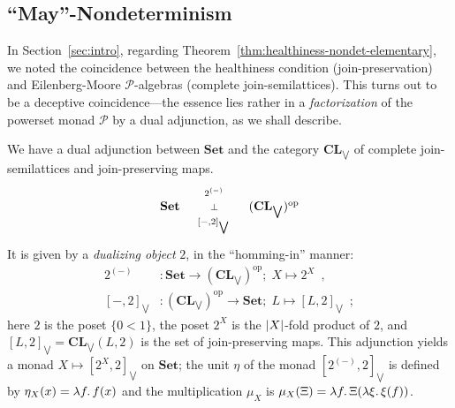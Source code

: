 \documentclass[9pt, preprint]{sigplanconf}
\theoremstyle{theorem}
\theoremstyle{definition}
\newcommand{\pow}{\mathcal{P}}
\newcommand{\place}{{-}}
\newcommand{\op}{\mathrm{op}}
\newcommand{\Set}{\mathbf{Set}}
\newcommand{\Sets}{\Set}
\newcommand{\CL}{\mathbf{CL}}
\newcommand{\biglor}{\bigvee}
\DeclarePairedDelimiter\abs{\lvert}{\rvert}
\DeclarePairedDelimiter\p{(}{)}
\newcommand{\longto}{\longrightarrow}
\begin{document}
\subsection{``May''-Nondeterminism}
\label{sub:diamond-modality}
In Section~\ref{sec:intro}, regarding
Theorem~\ref{thm:healthiness-nondet-elementary}, we noted
the coincidence between the healthiness condition (join-preservation)
and Eilenberg-Moore $\pow$-algebras (complete join-semilattices).
This turns out to be a deceptive coincidence---the essence lies rather
in a \emph{factorization} of the powerset monad $\pow$ by a dual
adjunction, as we shall describe.

We have a dual adjunction between $\Set$ and the category
$\CL_{\biglor}$
of complete join-semilattices and join-preserving maps.
\begin{align}
  \label{eq:set-jslat-dualadj}
  \vcenter{\xymatrix@1@C+3em{
    \Set \ar@/^/[r]^-{2^{(\place)}} \ar@{}[r]|-{\bot}
    & (\CL_{\bigvee})^{\op} \ar@/^/[l]^-{[\place, 2]_{\bigvee}}
  }}
\end{align}
It is given by a \emph{dualizing object} $2$, in the ``homming-in''
manner:
\begin{align*}
  2^{(\place)} &\colon \Set \longto (\CL_{\biglor})^{\op};\;  X \longmapsto 2^X\enspace, \\
  [\place, 2]_{\biglor} &\colon (\CL_{\biglor})^{\op} \longto \Set;\;  L \longmapsto [L, 2]_{\biglor} \enspace ;
\end{align*}
here $2$ is the poset $\{ 0 < 1 \}$,
the poset $2^X$ is the  $\abs{X}$-fold product of $2$,
and $[L, 2]_{\biglor} = \CL_{\biglor}(L, 2)$ is the set of
join-preserving maps.
This adjunction yields a monad
$X\mapsto [2^X, 2]_{\biglor}$ on $\Sets$;
the unit $\eta$ of the monad $[2^{(\place)}, 2]_{\biglor}$ is defined by $\eta_X(x) = \lambda f \ldotp f(x)$
and the multiplication $\mu_X$ is
$\mu_X(\Xi) = \lambda f \ldotp \Xi \p*{\lambda \xi \ldotp \xi(f)}$.
\end{document}
